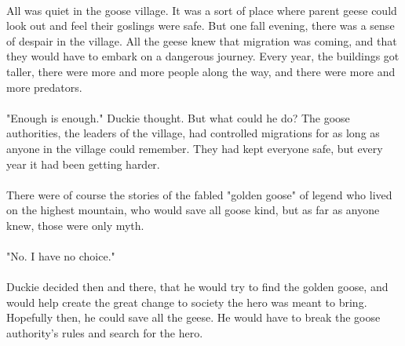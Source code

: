 \documentclass[a4paper,11pt,standalone]{book}
\begin{document}
\paragraph{} All was quiet in the goose village. It was a sort of place where parent geese could look out and feel their goslings were safe. But one fall evening, there was a sense of despair in the village. All the geese knew that migration was coming, and that they would have to embark on a dangerous journey. Every year, the buildings got taller, there were more and more people along the way, and there were more and more predators. 
\paragraph{} "Enough is enough." Duckie thought. But what could he do? The goose authorities, the leaders of the village, had controlled migrations for as long as anyone in the village could remember. They had kept everyone safe, but every year it had been getting harder.
\paragraph{} There were of course the stories of the fabled "golden goose" of legend who lived on the highest mountain, who would save all goose kind, but as far as anyone knew, those were only myth.  
\paragraph{} "No. I have no choice." 
\paragraph{} Duckie decided then and there, that he would try to find the golden goose, and would help create the great change to society the hero was meant to bring. Hopefully then, he could save all the geese. He would have to break the goose authority's rules and search for the hero.
\vfill
\pagebreak






\end{document}
